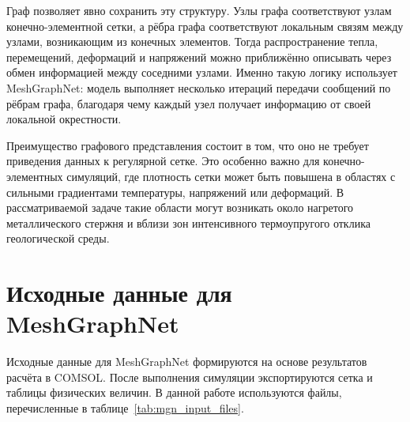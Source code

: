 Граф позволяет явно сохранить эту структуру. Узлы графа соответствуют узлам конечно-элементной сетки, а рёбра графа соответствуют локальным связям между узлами, возникающим из конечных элементов. Тогда распространение тепла, перемещений, деформаций и напряжений можно приближённо описывать через обмен информацией между соседними узлами. Именно такую логику использует MeshGraphNet: модель выполняет несколько итераций передачи сообщений по рёбрам графа, благодаря чему каждый узел получает информацию от своей локальной окрестности.

Преимущество графового представления состоит в том, что оно не требует приведения данных к регулярной сетке. Это особенно важно для конечно-элементных симуляций, где плотность сетки может быть повышена в областях с сильными градиентами температуры, напряжений или деформаций. В рассматриваемой задаче такие области могут возникать около нагретого металлического стержня и вблизи зон интенсивного термоупругого отклика геологической среды.

\section{Исходные данные для MeshGraphNet}

Исходные данные для MeshGraphNet формируются на основе результатов расчёта в COMSOL. После выполнения симуляции экспортируются сетка и таблицы физических величин. В данной работе используются файлы, перечисленные в таблице~\ref{tab:mgn_input_files}.

